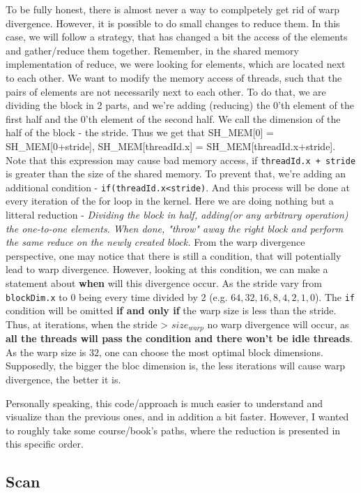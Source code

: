To be fully honest, there is almost never a way to complpetely get rid of warp divergence.
However, it is possible to do small changes to reduce them. 
In this case, we will follow a strategy, that has changed a bit the access of the elements and 
gather/reduce them together. Remember, in the shared memory implementation of reduce, we were 
looking for elements, which are located next to each other. 
We want to modify the memory access of threads, such that the pairs of elements are not necessarily next to each other. To do that, we are dividing the block in 2 parts, and we're adding (reducing) the 
0'th element of the first half and the 0'th element of the second half. We call the dimension
of the half of the block - the stride. Thus we get that SH\_MEM[0] = SH\_MEM[0+stride], 
SH\_MEM[threadId.x] = SH\_MEM[threadId.x+stride]. Note that this expression may cause bad memory 
access, if \verb|threadId.x + stride| is greater than the size of the shared memory. To prevent that, 
we're adding an additional condition - \verb|if(threadId.x<stride)|.
And this process will be done at every iteration
of the for loop in the kernel. Here we are doing nothing but a litteral reduction - \textit{Dividing
the block in half, adding(or any arbitrary operation) the one-to-one elements. When done, 
"throw" away the right block and perform the same reduce on the newly created block.}
From the warp divergence perspective, one may notice that there is still a condition, that will potentially
lead to warp divergence. However, looking at this condition, we can make a statement 
about \textbf{when} will this divergence occur. As the stride vary from \verb|blockDim.x| to 
$0$ being every time divided by 2 (e.g. $64, 32, 16, 8, 4, 2, 1, 0$). The \verb|if| condition will be
omitted \textbf{if and only if} the warp size is less than the stride. Thus, at iterations, when
the stride > $size_{warp}$ no warp divergence will occur, as \textbf{all the threads will pass the condition and there won't be idle threads}. As the warp size is $32$, one can choose the most optimal block dimensions.
Supposedly, the bigger the bloc dimension is, the less iterations will cause warp divergence, the better it is. 

Personally speaking, this code/approach is much easier to understand and visualize than the previous ones, and in addition
a bit faster. However, I wanted to roughly take some course/book's paths, where the reduction is 
presented in this specific order.


\subsection{Scan}


